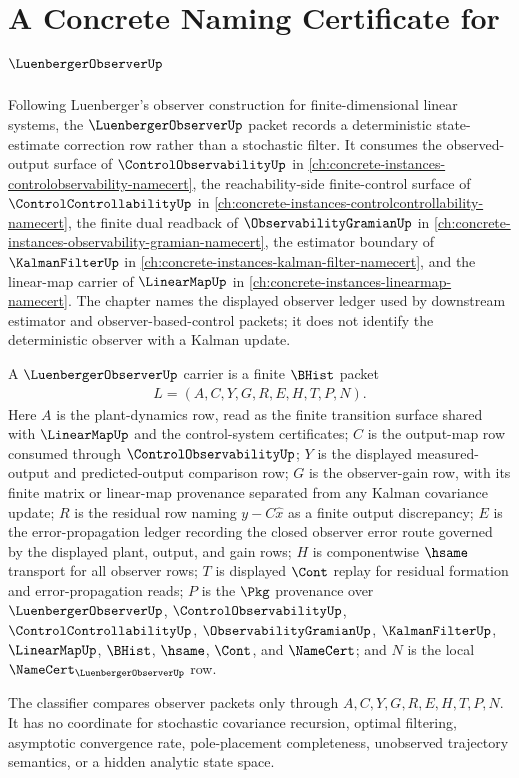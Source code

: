 \chapter{A Concrete Naming Certificate for $\LuenbergerObserverUp$}
\label{ch:concrete-instances-luenberger-observer-namecert}

Following Luenberger's observer construction for finite-dimensional linear systems, the $\LuenbergerObserverUp$ packet records a deterministic state-estimate correction row rather than a stochastic filter. It consumes the observed-output surface of $\ControlObservabilityUp$ in \autoref{ch:concrete-instances-controlobservability-namecert}, the reachability-side finite-control surface of $\ControlControllabilityUp$ in \autoref{ch:concrete-instances-controlcontrollability-namecert}, the finite dual readback of $\ObservabilityGramianUp$ in \autoref{ch:concrete-instances-observability-gramian-namecert}, the estimator boundary of $\KalmanFilterUp$ in \autoref{ch:concrete-instances-kalman-filter-namecert}, and the linear-map carrier of $\LinearMapUp$ in \autoref{ch:concrete-instances-linearmap-namecert}. The chapter names the displayed observer ledger used by downstream estimator and observer-based-control packets; it does not identify the deterministic observer with a Kalman update.

\begin{definition}
\label{def:luenberger-observer-carrier}
A $\LuenbergerObserverUp$ carrier is a finite $\BHist$ packet
$$
\begin{gathered}
L=(A,C,Y,G,R,E,H,T,P,N).
\end{gathered}
$$
Here $A$ is the plant-dynamics row, read as the finite transition surface shared with $\LinearMapUp$ and the control-system certificates; $C$ is the output-map row consumed through $\ControlObservabilityUp$; $Y$ is the displayed measured-output and predicted-output comparison row; $G$ is the observer-gain row, with its finite matrix or linear-map provenance separated from any Kalman covariance update; $R$ is the residual row naming $y-C\widehat{x}$ as a finite output discrepancy; $E$ is the error-propagation ledger recording the closed observer error route governed by the displayed plant, output, and gain rows; $H$ is componentwise $\hsame$ transport for all observer rows; $T$ is displayed $\Cont$ replay for residual formation and error-propagation reads; $P$ is the $\Pkg$ provenance over $\LuenbergerObserverUp$, $\ControlObservabilityUp$, $\ControlControllabilityUp$, $\ObservabilityGramianUp$, $\KalmanFilterUp$, $\LinearMapUp$, $\BHist$, $\hsame$, $\Cont$, and $\NameCert$; and $N$ is the local $\NameCert_{\LuenbergerObserverUp}$ row.

The classifier compares observer packets only through $A,C,Y,G,R,E,H,T,P,N$. It has no coordinate for stochastic covariance recursion, optimal filtering, asymptotic convergence rate, pole-placement completeness, unobserved trajectory semantics, or a hidden analytic state space.
\end{definition}

